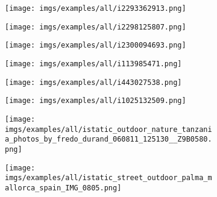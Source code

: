 \documentclass{article}
\begin{document}
\begin{figure}[htbp]
  \begin{subfigure}{0.3\textwidth}
    \texttt{[image: imgs/examples/all/i2293362913.png]}
  \end{subfigure}
  \begin{subfigure}{0.3\textwidth}
    \texttt{[image: imgs/examples/all/i2298125807.png]}
  \end{subfigure}
  \begin{subfigure}{0.3\textwidth}
    \texttt{[image: imgs/examples/all/i2300094693.png]}
  \end{subfigure}

  
  \begin{subfigure}{0.3\textwidth}
    \texttt{[image: imgs/examples/all/i113985471.png]}
  \end{subfigure}
  \begin{subfigure}{0.3\textwidth}
    \texttt{[image: imgs/examples/all/i443027538.png]}
  \end{subfigure}
  \begin{subfigure}{0.3\textwidth}
    \texttt{[image: imgs/examples/all/i1025132509.png]}
  \end{subfigure}
  
  \begin{subfigure}{0.3\textwidth}
    \texttt{[image: imgs/examples/all/istatic\_outdoor\_nature\_tanzania\_photos\_by\_fredo\_durand\_060811\_125130\_\_Z9B0580.png]}
  \end{subfigure}
  \begin{subfigure}{0.3\textwidth}
    \texttt{[image: imgs/examples/all/istatic\_street\_outdoor\_palma\_mallorca\_spain\_IMG\_0805.png]}
  \end{subfigure}
  
\end{figure}
\end{document}
